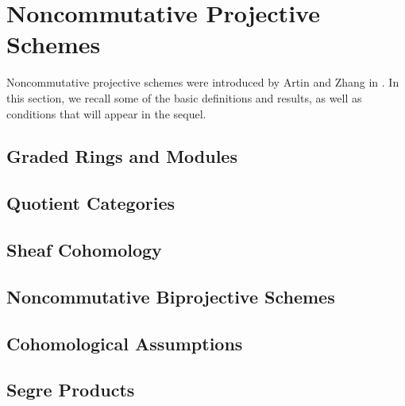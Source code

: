 \chapter{Noncommutative Projective Schemes}\label{chapter: background on NCP}

Noncommutative projective schemes were introduced by Artin and Zhang in \parencite{AZ94}.
In this section, we recall some of the basic definitions and results, as well as conditions that will appear in the sequel.

\section{Graded Rings and Modules}


\section{Quotient Categories}


\section{Sheaf Cohomology}


\section{Noncommutative Biprojective Schemes}


\section{Cohomological Assumptions}


\section{Segre Products}




